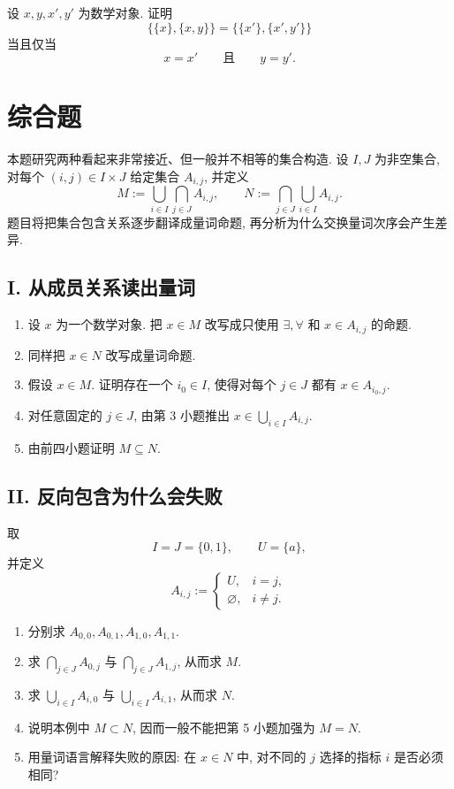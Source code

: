 \documentclass[usesamecnt, thmcnt=section, lang=cn, newtx, 10pt, scheme=chinese]{elegantbook}
\begin{document}
\begin{exercise}\label{ex:sets-19}
设 $x,y,x',y'$ 为数学对象. 证明
\[
 \bigl\{\{x\},\{x,y\}\bigr\}
 =
 \bigl\{\{x'\},\{x',y'\}\bigr\}
\]
当且仅当
\[
 x=x'
 \qquad\text{且}\qquad
 y=y'.
\]
\end{exercise}

\section{综合题}

本题研究两种看起来非常接近、但一般并不相等的集合构造. 设 $I,J$ 为非空集合, 对每个 $(i,j)\in I\times J$ 给定集合 $A_{i,j}$, 并定义
\[
 M:=\bigcup_{i\in I}\bigcap_{j\in J}A_{i,j},
 \qquad
 N:=\bigcap_{j\in J}\bigcup_{i\in I}A_{i,j}.
\]
题目将把集合包含关系逐步翻译成量词命题, 再分析为什么交换量词次序会产生差异.

\subsection*{I. 从成员关系读出量词}
\begin{enumerate}[label=\textbf{\arabic*.}, series=sets-comprehensive]
  \item 设 $x$ 为一个数学对象. 把 $x\in M$ 改写成只使用 $\exists,\forall$ 和 $x\in A_{i,j}$ 的命题.
  \item 同样把 $x\in N$ 改写成量词命题.
  \item 假设 $x\in M$. 证明存在一个 $i_0\in I$, 使得对每个 $j\in J$ 都有 $x\in A_{i_0,j}$.
  \item 对任意固定的 $j\in J$, 由第 3 小题推出 $x\in\bigcup_{i\in I}A_{i,j}$.
  \item 由前四小题证明 $M\subseteq N$.
\end{enumerate}

\subsection*{II. 反向包含为什么会失败}
取
\[
 I=J=\{0,1\},\qquad U=\{a\},
\]
并定义
\[
 A_{i,j}:=
 \begin{cases}
 U,&i=j,\\
 \varnothing,&i\neq j.
 \end{cases}
\]
\begin{enumerate}[label=\textbf{\arabic*.}, resume=sets-comprehensive]
  \item 分别求 $A_{0,0},A_{0,1},A_{1,0},A_{1,1}$.
  \item 求 $\bigcap_{j\in J}A_{0,j}$ 与 $\bigcap_{j\in J}A_{1,j}$, 从而求 $M$.
  \item 求 $\bigcup_{i\in I}A_{i,0}$ 与 $\bigcup_{i\in I}A_{i,1}$, 从而求 $N$.
  \item 说明本例中 $M\subset N$, 因而一般不能把第 5 小题加强为 $M=N$.
  \item 用量词语言解释失败的原因: 在 $x\in N$ 中, 对不同的 $j$ 选择的指标 $i$ 是否必须相同?
\end{enumerate}
\end{document}
